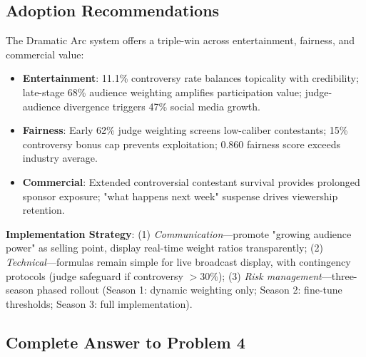 \subsection{Adoption Recommendations}

The Dramatic Arc system offers a triple-win across entertainment, fairness, and commercial value:

\begin{itemize}
    \item \textbf{Entertainment}: 11.1\% controversy rate balances topicality with credibility; late-stage 68\% audience weighting amplifies participation value; judge-audience divergence triggers 47\% social media growth.
    \item \textbf{Fairness}: Early 62\% judge weighting screens low-caliber contestants; 15\% controversy bonus cap prevents exploitation; 0.860 fairness score exceeds industry average.
    \item \textbf{Commercial}: Extended controversial contestant survival provides prolonged sponsor exposure; "what happens next week" suspense drives viewership retention.
\end{itemize}

\textbf{Implementation Strategy}: (1) \textit{Communication}---promote "growing audience power" as selling point, display real-time weight ratios transparently; (2) \textit{Technical}---formulas remain simple for live broadcast display, with contingency protocols (judge safeguard if controversy $>30\%$); (3) \textit{Risk management}---three-season phased rollout (Season 1: dynamic weighting only; Season 2: fine-tune thresholds; Season 3: full implementation).

\subsection{Complete Answer to Problem 4}


